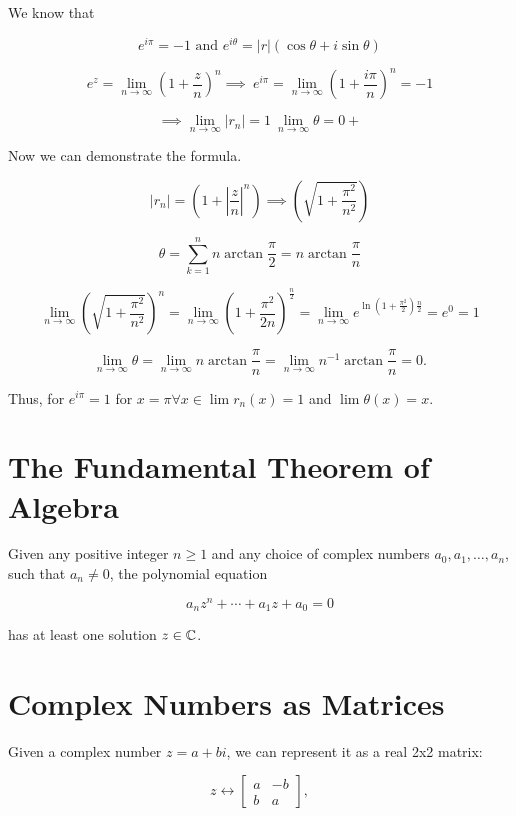 We know that

\[
	e^{i\pi} = -1 \text{ and } e^{i\theta} = |r|(\cos{\theta} + i\sin{\theta})
\]

\[
	e^{z} = \lim_{n \to \infty} {\left( 1 + \frac{z}{n}\right)}^n \implies\ e^{i\pi} = 
	\lim_{n \to \infty} {\left( 1 + \frac{i\pi}{n}\right)}^n = -1
\]

\[
	\implies \lim_{n \to \infty} |r_n| = 1\ \lim_{n \to \infty} \theta = 0+
\]

Now we can demonstrate the formula.

\[
	|r_n| = \left( 1 + \left|\frac{z}{n}\right|^n \right) \implies 
	\left( \sqrt{1 + \frac{\pi^2}{n^2}}\right)
\]

\[
	\theta = \sum_{k = 1}^{n} n \arctan \frac{\pi}{2} = n \arctan \frac{\pi}{n}
\]

\[
	\lim_{n \to \infty} {\left( \sqrt{1 + \frac{\pi^2}{n^2}}\right)}^n = \lim_{n \to \infty} 
	{\left( 1 + \frac{\pi^2}{2n} \right) }^{\frac{n}{2}}
	= \lim_{n \to \infty} e^{\ln\left(1 +\frac{\pi^2}{2}\right) \frac{n}{2}} = e^0 = 1
\]

\[
	\lim_{n \to \infty} \theta = \lim_{n \to \infty} n \arctan \frac{\pi}{n} = \lim_{n \to \infty} 
	n^{-1} \arctan\frac{\pi}{n} = 0.
\]

Thus, for \(e^{i\pi} = 1\) for \(x = \pi \forall x \in \lim r_n (x) = 1\) and \( \lim \theta (x) = x\).

\QED

\section{The Fundamental Theorem of Algebra}

Given any positive integer \(n \geq 1\) and any choice of complex numbers \(a_0, a_1, \ldots, a_n\), 
such that \(a_n \neq 0\), the polynomial equation

\[
	a_n z^n + \cdots + a_1 z + a_0 = 0 
\]

has at least one solution \(z \in \mathbb{C}\).

\section{Complex Numbers as Matrices}

Given a complex number \( z = a + bi \), we can represent it as a real 2x2 matrix:

\[
	z \leftrightarrow \begin{bmatrix}
		a & -b \\
		b & a
	\end{bmatrix},
\]

